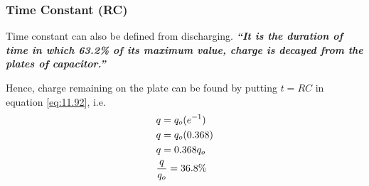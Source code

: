 \subsubsection{Time Constant (RC)}
Time constant can also be defined from discharging.
\textit{\textbf{“It is the duration of time in which 63.2\% of
its maximum value, charge is decayed from the plates of capacitor.”}}

\noindent Hence, charge remaining on the plate can be found by putting
$t= RC$ in equation \ref{eq:11.92}, i.e.
\begin{equation}\notag
  \begin{split}
    &q = q_{o}(e^{-1}) \\
    &q = q_{o}(0.368)\\
   &q = 0.368 q_{o}\\
  &\frac{q}{q_{o}} = 36.8\%
  \end{split}
\end{equation}

